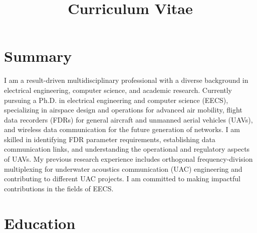 \documentclass[11pt,a4paper,sans]{moderncv} %
\title{Curriculum Vitae}
\begin{document}
\makecvtitle %




\section{Summary}
I am a result-driven multidisciplinary professional with a diverse background in electrical engineering, computer science, and academic research. Currently pursuing a Ph.D. in electrical engineering and computer science (EECS), specializing in airspace design and operations for advanced air mobility, flight data recorders (FDRs) for general aircraft and unmanned aerial vehicles (UAVs), and wireless data communication for the future generation of networks. I am skilled in identifying FDR parameter requirements, establishing data communication links, and understanding the operational and regulatory aspects of UAVs. My previous research experience includes orthogonal frequency-division multiplexing for underwater acoustics communication (UAC) engineering and contributing to different UAC projects. I am committed to making impactful contributions in the fields of EECS.
\section{Education}


\end{document}
